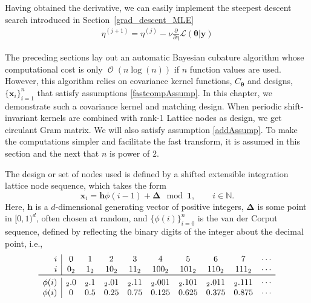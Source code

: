 \documentclass{iitthesis}          %
\DeclareMathOperator{\Order}{{\mathcal O}}
\newcommand{\bm}[1]{\boldsymbol{#1}}
\newcommand{\naturals}{\mathbb{N}}
\newcommand{\vDelta}{{\boldsymbol{\Delta}}}
\newcommand{\vtheta}{{\bm{\theta}}}
\newcommand{\vh}{\bm{h}}
\newcommand{\vx}{\bm{x}}
\newcommand{\vy}{\bm{y}}
\newcommand{\vone}{\bm{1}}
\newcommand\secref{Section~\ref}
\begin{document}
Having obtained the derivative, we can easily implement the steepest descent search introduced in \secref{grad_descent_MLE} 
\begin{align*}
\eta^{(j+1)} = \eta^{(j)} - \nu \frac{\partial}{\partial \eta} \mathcal{L}(\vtheta | \vy)
\end{align*}













\label{sec:shift_invariant_kernel}

The preceding sections lay out an automatic Bayesian cubature algorithm whose computational cost is only $\Order(n \log(n))$ if $n$ function values are used.  However, this algorithm relies on covariance kernel functions, $C_{\vtheta}$ and designs, $\{\vx_i\}_{i=1}^n$ that satisfy assumptions \eqref{fastcompAssump}.  
In this chapter, we demonstrate such a covariance kernel and matching design.
When periodic shift-invariant kernels are combined with rank-1 Lattice nodes as design, we get circulant Gram matrix. 
We will also satisfy assumption \eqref{addAssump}.  To make the computations simpler and facilitate the fast transform, it is assumed in this section and the next that $n$ is power of $2$.  



The design or set of nodes used is defined by a shifted extensible integration lattice node sequence, which takes the form
\begin{equation}
\label{eqn:lattice_gen}
\vx_{i} = \vh \phi(i-1) + \vDelta \mod \vone, \qquad i \in \naturals.
\end{equation} 
Here, $\vh$ is a $d$-dimensional generating vector of positive integers, $\vDelta$ is some point in $[0,1)^d$, often chosen at random, and $\{\phi(i)\}_{i=0}^n$ is the van der Corput sequence, defined by reflecting the binary digits of the integer about the decimal point, i.e., 
\begin{equation} \label{vdCDef}
\begin{array}{r|ccccccccccccc}
i & 0 & 1 & 2 & 3 & 4 &  5 & 6 & 7 & \cdots \\
i & 0_2 & 1_2 & 10_2 & 11_2 & 100_2 & 101_2 & 110_2 & 111_2  & \cdots\\
\toprule
\phi(i) & {}_2.0 &  {}_2.1 & {}_2.01 &  {}_2.11  & {}_2.001 &  {}_2.101 & {}_2.011 &  {}_2.111 & \cdots\\
\phi(i) & 0 &  0.5 &  0.25 & 0.75 &  0.125 & 0.625  &  0.375 & 0.875 & \cdots
\end{array}
\end{equation}
\end{document}
